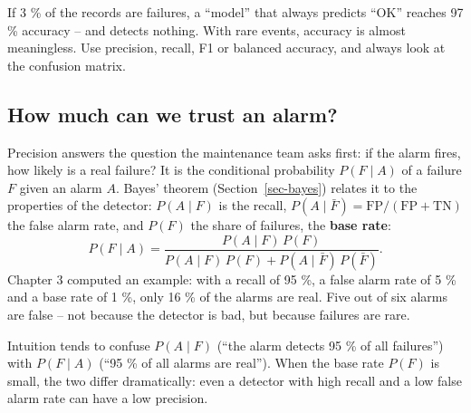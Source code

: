 \documentclass[
  letterpaper,
  DIV=11,
  numbers=noendperiod]{scrreprt}
\begin{document}
\begin{tcolorbox}[enhanced jigsaw, left=2mm, title=\textcolor{quarto-callout-warning-color}{\faExclamationTriangle}\hspace{0.5em}{Pitfall: accuracy on imbalanced data}, opacityback=0, breakable, rightrule=.15mm, arc=.35mm, toptitle=1mm, colbacktitle=quarto-callout-warning-color!10!white, opacitybacktitle=0.6, coltitle=black, colframe=quarto-callout-warning-color-frame, bottomrule=.15mm, leftrule=.75mm, bottomtitle=1mm, titlerule=0mm, toprule=.15mm, colback=white]

If 3 \% of the records are failures, a ``model'' that always predicts
``OK'' reaches 97 \% accuracy -- and detects nothing. With rare events,
accuracy is almost meaningless. Use precision, recall, F1 or balanced
accuracy, and always look at the confusion matrix.

\end{tcolorbox}

\subsection{How much can we trust an
alarm?}\label{how-much-can-we-trust-an-alarm}

Precision answers the question the maintenance team asks first: if the
alarm fires, how likely is a real failure? It is the conditional
probability \(P(F \mid A)\) of a failure \(F\) given an alarm \(A\).
Bayes' theorem (Section~\ref{sec-bayes}) relates it to the properties of
the detector: \(P(A \mid F)\) is the recall,
\(P(A \mid \bar F) = \text{FP}/(\text{FP} + \text{TN})\) the false alarm
rate, and \(P(F)\) the share of failures, the \textbf{base rate}:
\[P(F \mid A) = \frac{P(A \mid F)\,P(F)}{P(A \mid F)\,P(F) + P(A \mid \bar F)\,P(\bar F)}.\]
Chapter 3 computed an example: with a recall of 95 \%, a false alarm
rate of 5 \% and a base rate of 1 \%, only 16 \% of the alarms are real.
Five out of six alarms are false -- not because the detector is bad, but
because failures are rare.

\begin{tcolorbox}[enhanced jigsaw, left=2mm, title=\textcolor{quarto-callout-warning-color}{\faExclamationTriangle}\hspace{0.5em}{Pitfall: base rate neglect}, opacityback=0, breakable, rightrule=.15mm, arc=.35mm, toptitle=1mm, colbacktitle=quarto-callout-warning-color!10!white, opacitybacktitle=0.6, coltitle=black, colframe=quarto-callout-warning-color-frame, bottomrule=.15mm, leftrule=.75mm, bottomtitle=1mm, titlerule=0mm, toprule=.15mm, colback=white]

Intuition tends to confuse \(P(A \mid F)\) (``the alarm detects 95 \% of
all failures'') with \(P(F \mid A)\) (``95 \% of all alarms are real'').
When the base rate \(P(F)\) is small, the two differ dramatically: even
a detector with high recall and a low false alarm rate can have a low
precision.

\end{tcolorbox}
\end{document}
